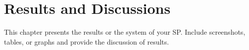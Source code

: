 \chapter{Results and Discussions}
This chapter  presents the results or  the system  of your SP.  Include screenshots, tables, or graphs and provide the discussion of results.